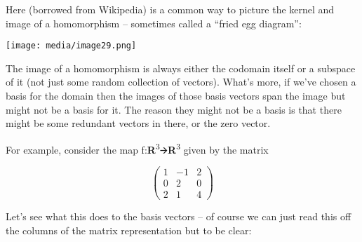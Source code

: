 \documentclass[oneside,english]{amsbook}
\numberwithin{section}{chapter}
\theoremstyle{plain}
\theoremstyle{definition}
\begin{document}
Here (borrowed from Wikipedia) is a common way to picture the kernel and
image of a homomorphism -- sometimes called a ``fried egg diagram'':

\texttt{[image: media/image29.png]}

The image of a homomorphism is always either the codomain itself or a
subspace of it (not just some random collection of vectors). What's
more, if we've chosen a basis for the domain then the images of those
basis vectors span the image but might not be a basis for it. The reason
they might not be a basis is that there might be some redundant vectors
in there, or the zero vector.

For example, consider the map
f:\textbf{R}\textsuperscript{3}🡪\textbf{R}\textsuperscript{3} given by
the matrix

\[\begin{pmatrix}
	1 & - 1 & 2 \\
	0 & 2 & 0 \\
	2 & 1 & 4
\end{pmatrix}\]

Let's see what this does to the basis vectors -- of course we can just
read this off the columns of the matrix representation but to be clear:
\end{document}
